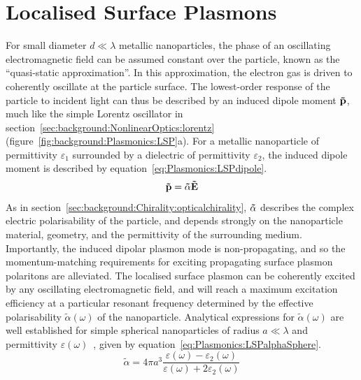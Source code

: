 \section{Localised Surface Plasmons}\label{sec:background:Plasmonics:Metamaterials}

For small diameter $d \ll \lambda$ metallic nanoparticles, the phase of an oscillating electromagnetic field can be assumed constant over the particle, known as the ``quasi-static approximation''. In this approximation, the electron gas is driven to coherently oscillate at the particle surface. The lowest-order response of the particle to incident light can thus be described by an induced dipole moment $\bf{\tilde p}$, much like the simple Lorentz oscillator in section~\ref{sec:background:NonlinearOptics:lorentz} (figure~\ref{fig:background:Plasmonics:LSP}a).
For a metallic nanoparticle of permittivity $\varepsilon_1$ surrounded by a dielectric of permittivity $\varepsilon_2$, the induced dipole moment is described by equation~\ref{eq:Plasmonics:LSPdipole}. 
\begin{equation}\label{eq:Plasmonics:LSPdipole}
    {\bf{\tilde p}} = {\bf{\tilde \alpha }}{\bf{\tilde E}}
\end{equation}
As in section~\ref{sec:background:Chirality:opticalchirality}, $\bf{\tilde \alpha }$ describes the complex electric polarisability of the particle, and depends strongly on the nanoparticle material, geometry, and the permittivity of the surrounding medium.
Importantly, the induced dipolar plasmon mode is non-propagating, and so the momentum-matching requirements for exciting propagating surface plasmon polaritons are alleviated. The localised surface plasmon can be coherently excited by any oscillating electromagnetic field, and will reach a maximum excitation efficiency at a particular resonant frequency determined by the effective polarisability ${\tilde \alpha }(\omega)$ of the nanoparticle.
Analytical expressions for ${\tilde \alpha }(\omega)$ are well established for simple spherical nanoparticles of radius $a \ll \lambda$ and permittivity $\varepsilon(\omega)$~\cite{Maier2007, Collins2017}, given by equation~\ref{eq:Plasmonics:LSPalphaSphere}. 
\begin{equation}\label{eq:Plasmonics:LSPalphaSphere}
    {\tilde \alpha } = 4\pi a^3 \frac{\varepsilon (\omega) - \varepsilon_2 (\omega)}{\varepsilon (\omega) + 2\varepsilon_2 (\omega)}
\end{equation}
